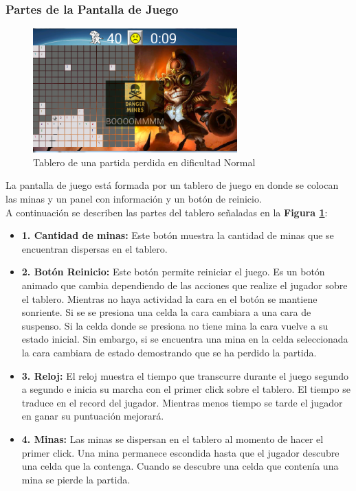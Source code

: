 \documentclass[11pt]{article} %
\begin{document}
\newpage
\thispagestyle{empty}

\subsubsection{\textbf{Partes de la Pantalla de Juego}}

\begin{center}

	\begin{figure}[h!]
  		\centering
    		\includegraphics[width=0.7\textwidth]{imagenes/partidaPerdida.PNG}
  		\caption{Tablero de una partida perdida en dificultad Normal}
		\label{partesdeltablero}
	\end{figure}
\end{center}

La pantalla de juego est\'a formada por un tablero de juego en donde se colocan las minas y un panel con informaci\'on y un bot\'on de reinicio.
\\A continuaci\'on se describen las partes del tablero se\~naladas en la \textbf{Figura \ref{partesdeltablero}}:

\begin{itemize}

\item \textbf{1. Cantidad de minas:} Este bot\'on muestra la cantidad de minas que se encuentran dispersas en el tablero.
\item \textbf{2. Bot\'on Reinicio:} Este bot\'on permite reiniciar el juego. Es un bot\'on animado que cambia dependiendo de las acciones que realize el jugador sobre el tablero. Mientras no haya actividad la cara en el bot\'on se mantiene sonriente. Si se se presiona una celda la cara cambiara a una cara de suspenso. Si la celda donde se presiona no tiene mina la cara vuelve a su estado inicial. Sin embargo, si se encuentra una mina en la celda seleccionada la cara cambiara de estado demostrando que se ha perdido la partida.
\item \textbf{3. Reloj:} El reloj muestra el tiempo que transcurre durante el juego segundo a segundo e inicia su marcha con el primer click sobre el tablero. El tiempo se traduce en el record del jugador. Mientras menos tiempo se tarde el jugador en ganar su puntuaci\'on mejorar\'a.
\item \textbf{4. Minas:} Las minas se dispersan en el tablero al momento de hacer el primer click. Una mina permanece escondida hasta que el jugador descubre una celda que la contenga. Cuando se descubre una celda que conten\'ia una mina se pierde la partida.

\end{itemize}
\end{document}

